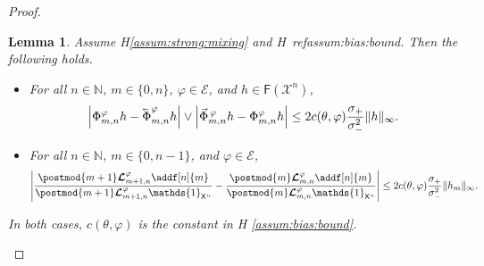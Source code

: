 \documentclass{article}
\newtheorem{lemma}[theorem]{Lemma}
\newcommand{\precparsp}{\mathcal{E}}
\newcommand{\Xfd}{\mathcal{X}}
\newcommand{\cev}[1]{\reflectbox{\ensuremath{\vec{\reflectbox{\ensuremath{#1}}}}}}
\newcommand{\shiftbwd}{\cev{\shiftsymbol}^{\precpar}}
\newcommand{\shiftfwd}{\vec{\shiftsymbol}^{\, \precpar}}
\newcommand{\shiftsymbol}{\Phi}
\newcommand{\precpar}{\varphi}
\newcommand{\intvect}[2]{\{ #1, #2 \}}
\newcommand{\noshift}{\shiftsymbol^{\precpar}}
\newcommand{\udlow}{\sigma_-}
\newcommand{\udup}{\sigma_+}
\newcommand{\nset}{\mathbb{N}}
\newcommand{\1}{\mathbbm{1}}
\newcommand{\retrokmod}{\boldsymbol{\mathcal{L}}^\precpar}
\newcommand{\Xset}{\mathsf{X}}
\newcommand{\bmf}[1]{\set{F}(#1)}
\newcommand{\set}[1]{\mathsf{#1}}
\def\1{\mathds{1}}
\begin{document}
\begin{proof}
\begin{lemma} \label{lem:diff:bound} 
Assume H\ref{assum:strong:mixing} and H\
ref{assum:bias:bound}. Then the following holds. 
\begin{itemize}
\item[(i)] For all $n \in \nset$, $m \in \intvect{0}{n}$, $\precpar \in \precparsp$, and $h \in \bmf{\Xfd^n}$,   
$$
\left| \noshift_{m, n} h - \shiftbwd_{m, n} h \right| \vee \left| \shiftfwd_{m, n} h - \noshift_{m, n} h \right| \leq 2 c(\theta,\varphi)  \frac{\udup}{\udlow^2} \| h \|_\infty.   
$$
\item[(ii)] For all $n \in \nset$, $m \in \intvect{0}{n - 1}$, and $\precpar \in \precparsp$,
$$
\left| \frac{\postmod{m + 1} \retrokmod_{m + 1, n} \addf[n]{m}}{\postmod{m + 1} \retrokmod_{m + 1, n} \1_{\Xset^n}} - \frac{\postmod{m} \retrokmod_{m, n} \addf[n]{m}}{\postmod{m} \retrokmod_{m, n} \1_{\Xset^n}} \right| \leq 2 c(\theta,\varphi)  \frac{\udup}{\udlow^2} \| h_m \|_\infty. 
$$
\end{itemize}
In both cases, $c(\theta,\varphi)$ is the constant in H
\ref{assum:bias:bound}. 
\end{lemma}


\end{proof}
\end{document}
